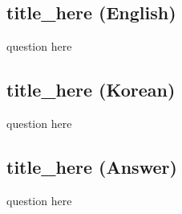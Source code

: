 \cleardoublepage
\subsection*{title_here (English)}

question here



\newpage
\subsection*{title_here (Korean)}

question here



\newpage
\subsection*{title_here (Answer)}

question here
